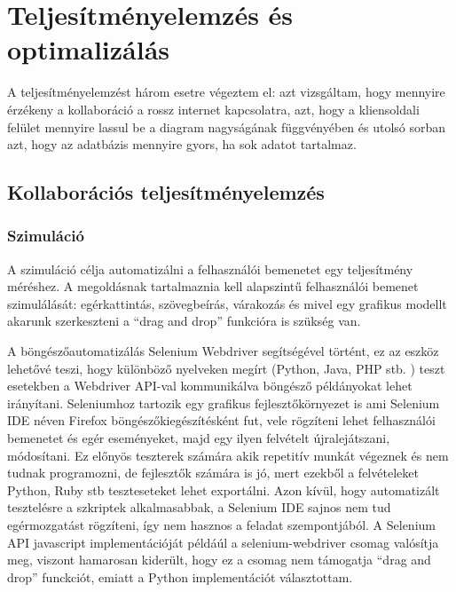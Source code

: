 \chapter{Teljesítményelemzés és optimalizálás}

A teljesítményelemzést három esetre végeztem el: azt vizsgáltam, hogy mennyire érzékeny a kollaboráció a rossz internet kapcsolatra, azt, hogy a kliensoldali felület mennyire lassul be a diagram nagyságának függvényében és utolsó sorban azt, hogy az adatbázis mennyire gyors, ha sok adatot tartalmaz. 


\section{Kollaborációs teljesítményelemzés}

\subsection{Szimuláció}
\label{sec:simprof}

A szimuláció célja automatizálni a felhasználói bemenetet egy teljesítmény méréshez. A megoldásnak tartalmaznia kell alapszintű felhasználói bemenet szimulálását: egérkattintás, szövegbeírás, várakozás és mivel egy grafikus modellt akarunk szerkeszteni a ``drag and drop'' funkcióra is szükség van. 

A böngészőautomatizálás Selenium Webdriver segítségével történt, ez az eszköz lehetővé teszi, hogy különböző nyelveken megírt (Python, Java, PHP stb. ) teszt esetekben a Webdriver API-val kommunikálva böngésző példányokat lehet irányítani. 
Seleniumhoz tartozik egy grafikus fejlesztőkörnyezet is ami Selenium IDE néven Firefox böngészőkiegészítésként fut, vele rögzíteni lehet felhasználói bemenetet és egér eseményeket, majd egy ilyen felvételt újralejátszani, módosítani. Ez előnyös teszterek számára akik repetitív munkát végeznek és nem tudnak programozni, de fejlesztők számára is jó, mert ezekből a felvételeket Python, Ruby stb teszteseteket lehet exportálni. 
Azon kívül, hogy automatizált tesztelésre a szkriptek alkalmasabbak, a Selenium IDE sajnos nem tud egérmozgatást rögzíteni, így nem hasznos a feladat szempontjából. A Selenium API javascript implementációját példáúl a selenium-webdriver csomag valósítja meg, viszont hamarosan kiderült, hogy ez a csomag nem támogatja ``drag and drop'' funckciót, emiatt a Python implementációt választottam. 


